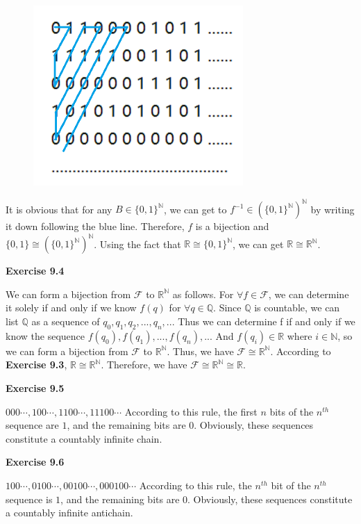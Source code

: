 \documentclass{article} %
\begin{document}
\begin{figure}[H]
    \centering
    \includegraphics[width=8cm]{9_3_1.png}
    \caption{}
    \label{}
    \end{figure}
It is obvious that for any $B\in \{0,1\}^\mathbb{N}$, we can get to $f^{-1}\in (\{0,1\}^\mathbb{N})^\mathbb{N}$ by writing it down following the blue line. Therefore, $f$ is a bijection and $\{0,1\}\cong (\{0,1\}^\mathbb{N})^\mathbb{N}$. Using the fact that $\mathbb{R}\cong \{0,1\}^\mathbb{N}$, we can get $\mathbb{R}\cong \mathbb{R}^\mathbb{N}$.\par


	\textbf{Exercise 9.4}\par
	We can form a bijection from $\mathcal{F}$ to $\mathbb{R}^\mathbb{N}$ as follows. For $\forall f\in \mathcal{F}$, we can determine it solely if and only if we know $f(q)$ for $\forall q\in \mathbb{Q}$. Since $\mathbb{Q}$ is countable, we can list $\mathbb{Q}$ as a sequence of $q_{0},q_{1},q_{2},...,q_{n},...$ Thus we can determine f if and only if we know the sequence $f(q_{0}),f(q_{1}),...,f(q_{n}),...$ And $f(q_{i})\in \mathbb{R}$ where $i\in \mathbb{N}$, so we can form a bijection from  $\mathcal{F}$ to $\mathbb{R}^\mathbb{N}$.
	Thus, we have   $\mathcal{F} \cong \mathbb{R}^{\mathbb{N}}$. According to \textbf{Exercise 9.3},  $\mathbb{R} \cong \mathbb{R}^{\mathbb{N}}$.
	Therefore, we have $\mathcal{F} \cong \mathbb{R}^{\mathbb{N}} \cong \mathbb{R}$.\par

	\textbf{Exercise 9.5}\par
    $000\cdots,100\cdots,1100\cdots,11100\cdots$ According to this rule, the first $n$ bits of the $n^{th}$ sequence are $1$, and the remaining bits are $0$. Obviously, these sequences constitute a countably infinite chain.\par
	
	\textbf{Exercise 9.6}\par
	$100\cdots,0100\cdots,00100\cdots,000100\cdots$ According to this rule, the $n^{th}$ bit of the $n^{th}$ sequence is $1$, and the remaining bits are $0$. Obviously, these sequences constitute a countably infinite antichain.\par
\end{document}
